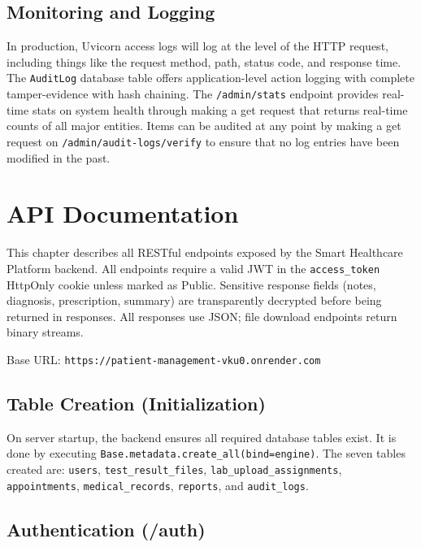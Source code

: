 \documentclass[a4paper,12pt]{report}
\begin{document}
\section{Monitoring and Logging}

In production, Uvicorn access logs will log at the level of the HTTP request, including things like the request method, path, status code, and response time.
The \texttt{AuditLog} database table offers application-level action logging with complete tamper-evidence with hash chaining.
The \texttt{/admin/stats} endpoint provides real-time stats on system health through making a get request that returns real-time counts of all major entities.
Items can be audited at any point by making a get request on \texttt{/admin/audit-logs/verify} to ensure that no log entries have been modified in the past.


\chapter{API Documentation}

This chapter describes all RESTful endpoints exposed by the Smart Healthcare Platform backend. All endpoints require a valid JWT in the \texttt{access\_token} HttpOnly cookie unless marked as Public. Sensitive response fields (notes, diagnosis, prescription, summary) are transparently decrypted before being returned in responses. All responses use JSON; file download endpoints return binary streams.

Base URL: \texttt{https://patient-management-vku0.onrender.com}

\section{Table Creation (Initialization)}

On server startup, the backend ensures all required database tables exist. It is done by executing \texttt{Base.metadata.create\_all(bind=engine)}. The seven tables created are: \texttt{users}, \texttt{test\_result\_files}, \texttt{lab\_upload\_assignments}, \texttt{appointments}, \texttt{medical\_records}, \texttt{reports}, and \texttt{audit\_logs}.

\section{Authentication (/auth)}
\end{document}
